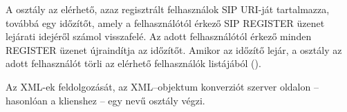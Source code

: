 \medskip

A  osztály az elérhető, azaz regisztrált felhasználok SIP URI-ját tartalmazza, továbbá egy időzítőt, amely a felhasználótól érkező SIP REGISTER üzenet lejárati idejéről számol visszafelé. Az adott felhasználótól érkező minden REGISTER üzenet újraindítja az időzítőt. Amikor az időzítő lejár, a  osztály az adott felhasználót törli az elérhető felhasználók listájából ().

\medskip

Az XML-ek feldolgozását, az XML--objektum konverziót szerver oldalon -- hasonlóan a klienshez -- egy  nevű osztály végzi.